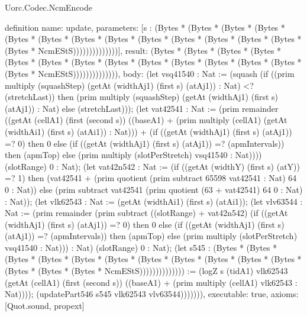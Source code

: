 \begin{lexlean}{Uorc.Codec.NcmEncode}
\begin{semanticmodule}
definition{
  name: update,
  parameters: [s : (Bytes * (Bytes * (Bytes * (Bytes * (Bytes * (Bytes * (Bytes * (Bytes * (Bytes * (Bytes * (Bytes * (Bytes * (Bytes * (Bytes * NcmEStS))))))))))))))],
  result: (Bytes * (Bytes * (Bytes * (Bytes * (Bytes * (Bytes * (Bytes * (Bytes * (Bytes * (Bytes * (Bytes * (Bytes * (Bytes * (Bytes * NcmEStS)))))))))))))),
  body: (let vsq41540 : Nat := (squash (if ((prim multiply (squashStep) (getAt (widthAj1) (first s) (atAj1)) : Nat) <? (stretchLast)) then (prim multiply (squashStep) (getAt (widthAj1) (first s) (atAj1)) : Nat) else (stretchLast))); (let vat42541 : Nat := (prim remainder ((getAt (cellA1) (first (second s)) ((baseA1) + (prim multiply (cellA1) (getAt (widthAi1) (first s) (atAi1)) : Nat))) + (if ((getAt (widthAj1) (first s) (atAj1)) =? 0) then 0 else (if ((getAt (widthAj1) (first s) (atAj1)) =? (apmIntervals)) then (apmTop) else (prim multiply (slotPerStretch) vsq41540 : Nat)))) (slotRange) 0 : Nat); (let vat42n542 : Nat := (if ((getAt (widthY) (first s) (atY)) =? 1) then (vat42541 + (prim quotient (prim subtract 65598 vat42541 : Nat) 64 0 : Nat)) else (prim subtract vat42541 (prim quotient (63 + vat42541) 64 0 : Nat) : Nat)); (let vlk62543 : Nat := (getAt (widthAi1) (first s) (atAi1)); (let vlv63544 : Nat := (prim remainder (prim subtract ((slotRange) + vat42n542) (if ((getAt (widthAj1) (first s) (atAj1)) =? 0) then 0 else (if ((getAt (widthAj1) (first s) (atAj1)) =? (apmIntervals)) then (apmTop) else (prim multiply (slotPerStretch) vsq41540 : Nat))) : Nat) (slotRange) 0 : Nat); (let s545 : (Bytes * (Bytes * (Bytes * (Bytes * (Bytes * (Bytes * (Bytes * (Bytes * (Bytes * (Bytes * (Bytes * (Bytes * (Bytes * (Bytes * NcmEStS)))))))))))))) := (logZ s (tidA1) vlk62543 (getAt (cellA1) (first (second s)) ((baseA1) + (prim multiply (cellA1) vlk62543 : Nat)))); (updatePart546 s545 vlk62543 vlv63544))))))),
  executable: true,
  axioms: [Quot.sound, propext]
}


\end{semanticmodule}
\end{lexlean}

